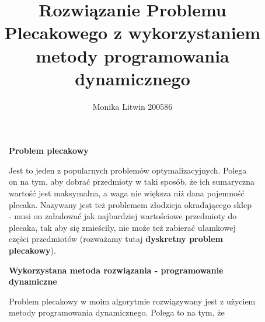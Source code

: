 \documentclass[a4paper,11pt]{report}
\title{Rozwiązanie Problemu Plecakowego z wykorzystaniem metody programowania dynamicznego}
\author{Monika Litwin 200586}
\begin{document}
\maketitle

\begin{figure}
  \begin{center}
  \textbf{Problem plecakowy}
\\
\begin{flushleft}

Jest to jeden z popularnych problemów optymalizacyjnych. Polega on na tym, aby dobrać przedmioty w taki sposób, że ich sumaryczna wartość jest maksymalna, a waga nie większa niż dana pojemność plecaka. Nazywany jest też problemem złodzieja okradającego sklep - musi on załadować jak najbardziej wartościowe przedmioty do plecaka, tak aby się zmieściły, nie może też zabierać ułamkowej części przedmiotów (rozważamy tutaj \textbf{dyskretny problem plecakowy}).

\end{flushleft}
  \end{center}
\end{figure}

\begin{figure}
  \begin{center}
  \textbf{Wykorzystana metoda rozwiązania - programowanie dynamiczne}
\\
\begin{flushleft}

Problem plecakowy w moim algorytmie rozwiązywany jest z użyciem metody programowania dynamicznego. Polega to na tym, że 

\end{flushleft}
  \end{center}
\end{figure}
\end{document}

